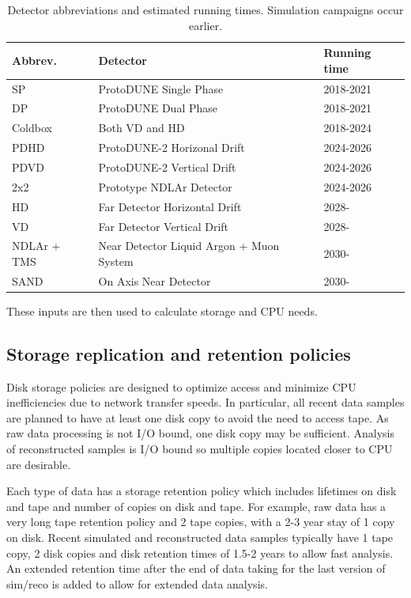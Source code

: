 \documentclass[12pt]{article}
\begin{document}
\begin{table}[h]
\begin{centering}
  \begin{tabular}{|l|l|l|}
     \hline
    Abbrev. & Detector & Running time\\
    \hline
    SP & ProtoDUNE Single Phase & 2018-2021\\
    DP & ProtoDUNE Dual Phase & 2018-2021\\
    Coldbox & Both VD and HD & 2018-2024\\
    PDHD & ProtoDUNE-2 Horizonal Drift & 2024-2026\\
    PDVD & ProtoDUNE-2 Vertical Drift & 2024-2026\\
    2x2& Prototype NDLAr Detector & 2024-2026\\
    HD & Far Detector Horizontal Drift & 2028-\\
    VD & Far Detector Vertical Drift & 2028-\\
    NDLAr + TMS & Near Detector Liquid Argon + Muon System & 2030-\\
    SAND & On Axis Near Detector & 2030- \\
     \hline
     \end{tabular}
       \caption{Detector abbreviations and estimated running times.  Simulation campaigns occur earlier. }\label{tab:detectors}
  \end{centering}
   
     \end{table}
     
     

  These inputs are then used to calculate storage and CPU needs. 

\subsection{Storage replication and retention policies}
Disk storage policies are designed to optimize access and minimize CPU inefficiencies due to network transfer speeds.  In particular, all recent data samples are planned to have at least one disk copy to avoid the need to access tape.  As raw data processing is not I/O bound, one disk copy may be sufficient. Analysis of reconstructed samples is I/O bound so multiple copies located closer to CPU are desirable. 

Each type of data has a storage retention policy which includes lifetimes on disk and tape and number of copies on disk and tape.  For example, raw data has a very long tape retention policy and 2 tape copies, with a 2-3 year stay of 1 copy on disk.   Recent simulated and reconstructed data samples typically have 1 tape copy, 2 disk copies and disk retention times of 1.5-2 years to allow fast analysis.   An extended retention time after the end of data taking for the last version of sim/reco is added to allow for extended data analysis. 
\end{document}
